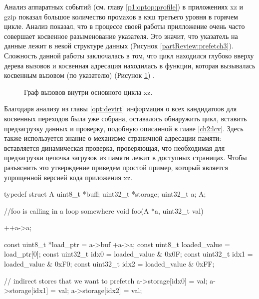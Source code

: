 Анализ аппаратных событий (см. главу \ref{p1:optop:profile}) в приложениях xz и gzip показал большое количество промахов в кэш третьего уровня в горячем цикле. Анализ показал, что в процессе своей работы прилложение очень часто совершает косвенное разыменование указателя. Это значит, что указатель на данные лежит в некой структуре данных (Рисунок \ref{partReview:prefetch3}). Сложность данной работы заключалась в том, что цикл находился глубоко вверху дерева вызовов и косвенная адресация находилась в функции, которая вызывалась косвенным вызовом (по указателю) (Рисунок \ref{optpref1}) \cite{E240105}. 
\begin{figure}[htbp]
	\centering
	
	\caption{Граф вызовов внутри основного цикла xz.}
	\label{optpref1}
\end{figure}
Благодаря анализу из главы \ref{opt:devirt} информация о всех кандидатоов для косвенных переходов была уже собрана, оставалось обнаружить цикл, вставить предзагрузку данных и проверку, подобную описанной в главе \ref{ch2:lcv}. Здесь также используется знание о механизме страничной адресации памяти: вставляется динамическая проверка, проверяющая, что необходимая для предзагрузки цепочка загрузок из памяти лежит в доступных страницах. Чтобы разъяснить это утверждение приведем простой пример, который является упрощенной версией кода приложения xz.

  \begin{ListingEnv}[!h]
 	\captiondelim{ } %
 	\caption{Образец кода для анализа косвенной предзагрузки данных.}\label{ind_pref1}
 	
 	\begin{Verb}
 	typedef struct A
 	{
 		uint8_t *buff;
 		uint32_t *storage;
 		uint32_t a;
 	} A;
 	
 	//foo is calling in a loop somewhere
 	void foo(A *a, uint32_t val)
 	{
 		++a->a;
 		
 		const uint8_t *load_ptr = a->buf +a->a;
 		const uint8_t loaded_value  = load_ptr[0];
 		const uint32_t idx0 = loaded_value & 0x0F;
 		const uint32_t idx1 = loaded_value & 0xF0;
 		const uint32_t idx2 = loaded_value & 0xFF;
 		
 		// indirect stores that we want to prefetch
 		a->storage[idx0] = val;
 		a->storage[idx1] = val;
 		a->storage[idx2] = val;
 	}
 	\end{Verb}
 \end{ListingEnv}
 
